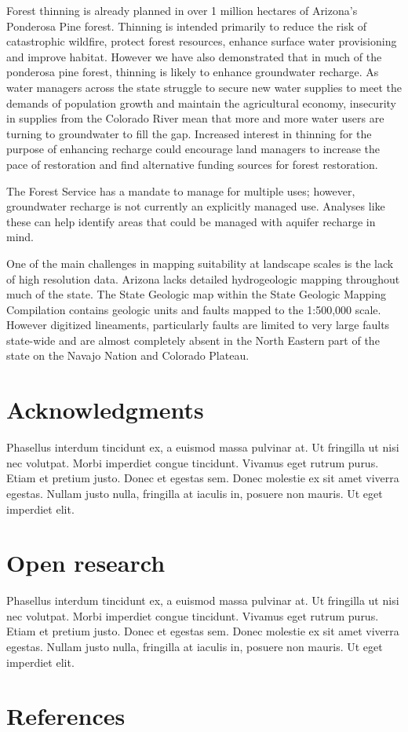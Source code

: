 \documentclass[
  number,
  preprint,
  3p,
  onecolumn]{elsarticle}
\begin{document}
Forest thinning is already planned in over 1 million hectares of
Arizona's Ponderosa Pine forest. Thinning is intended primarily to
reduce the risk of catastrophic wildfire, protect forest resources,
enhance surface water provisioning and improve habitat. However we have
also demonstrated that in much of the ponderosa pine forest, thinning is
likely to enhance groundwater recharge. As water managers across the
state struggle to secure new water supplies to meet the demands of
population growth and maintain the agricultural economy, insecurity in
supplies from the Colorado River mean that more and more water users are
turning to groundwater to fill the gap. Increased interest in thinning
for the purpose of enhancing recharge could encourage land managers to
increase the pace of restoration and find alternative funding sources
for forest restoration.

The Forest Service has a mandate to manage for multiple uses; however,
groundwater recharge is not currently an explicitly managed use.
Analyses like these can help identify areas that could be managed with
aquifer recharge in mind.

One of the main challenges in mapping suitability at landscape scales is
the lack of high resolution data. Arizona lacks detailed hydrogeologic
mapping throughout much of the state. The State Geologic map within the
State Geologic Mapping Compilation contains geologic units and faults
mapped to the 1:500,000 scale. However digitized lineaments,
particularly faults are limited to very large faults state-wide and are
almost completely absent in the North Eastern part of the state on the
Navajo Nation and Colorado Plateau.

\section{Acknowledgments}\label{acknowledgments}

Phasellus interdum tincidunt ex, a euismod massa pulvinar at. Ut
fringilla ut nisi nec volutpat. Morbi imperdiet congue tincidunt.
Vivamus eget rutrum purus. Etiam et pretium justo. Donec et egestas sem.
Donec molestie ex sit amet viverra egestas. Nullam justo nulla,
fringilla at iaculis in, posuere non mauris. Ut eget imperdiet elit.

\section{Open research}\label{open-research}

Phasellus interdum tincidunt ex, a euismod massa pulvinar at. Ut
fringilla ut nisi nec volutpat. Morbi imperdiet congue tincidunt.
Vivamus eget rutrum purus. Etiam et pretium justo. Donec et egestas sem.
Donec molestie ex sit amet viverra egestas. Nullam justo nulla,
fringilla at iaculis in, posuere non mauris. Ut eget imperdiet elit.

\section*{References}\label{references}

\renewcommand{\bibsection}{}

\end{document}
